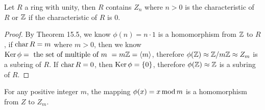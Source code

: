 \documentclass[../main.tex]{subfiles}
\begin{document}
\begin{corollary}
  Let $R$ a ring with unity, then $R$ contains $Z_n$ 
  where $n > 0$ is the characteristic of $R$ 
  or $\mathbb{Z}$ if the characteristic of $R$ is $0$.
\end{corollary}
\begin{proof}
  By Theorem 15.5, we know $\phi(n) = n \cdot 1$ is a homomorphism
  from $\mathbb{Z}$ to $R$, if $\operatorname{char} R = m$ where $m > 0$, then we know
  $\operatorname{Ker} \phi = \text{ the set of multiple of $m$ } = m \mathbb{Z} = \langle m \rangle$,
  therefore $\phi(\mathbb{Z}) \approx \mathbb{Z} / m \mathbb{Z} \approx Z_m$ is a subring of $R$.
  If $\operatorname{char} R = 0$, then $\operatorname{Ker} \phi = \{0\}$, 
  therefore $\phi(\mathbb{Z}) \approx \mathbb{Z}$ is a subring of $R$.
\end{proof}

\begin{corollary}
  For any positive integer $m$, the mapping $\phi(x) = x \operatorname{mod} m$
  is a homomorphism from $Z$ to $Z_m$.
\end{corollary}
\end{document}
